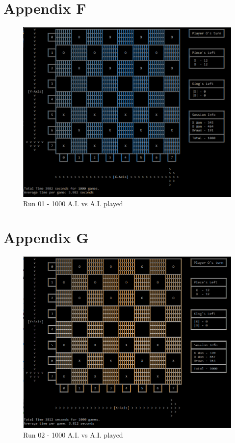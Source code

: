 \documentclass[10pt, a4paper]{article}
\begin{document}
 \section{Appendix F}
  \label{appendix:f}
 \begin{figure}[H]
 	\centering	
 	\includegraphics[scale=0.8]{RunOne1000}
 	\caption{Run 01 - 1000 A.I. vs A.I. played}		
 \end{figure}
 \newpage
 \section{Appendix G}
  \label{appendix:g}
 \begin{figure}[H]
 	\centering
 	\includegraphics[scale=0.8]{RunTwo1000}
 	\caption{Run 02 - 1000 A.I. vs A.I. played}
 \end{figure}
 \newpage
\end{document}
